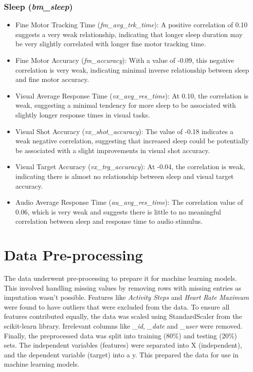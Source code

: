 \subsubsection*{Sleep (\textit{bm\_sleep})}

\begin{itemize}
    \item Fine Motor Tracking Time (\textit{fm\_avg\_trk\_time}): A positive correlation of 0.10 suggests a very weak relationship, indicating that longer sleep duration
    may be very slightly correlated with longer fine motor tracking time. 
        
    \item Fine Motor Accuracy (\textit{fm\_accuracy}): With a value of -0.09, this negative correlation is very weak, indicating minimal inverse relationship between sleep
    and fine motor accuracy.
    
    \item Visual Average Response Time (\textit{vx\_avg\_res\_time}): At 0.10, the correlation is weak, suggesting a minimal tendency for more sleep to be associated with slightly
    longer response times in visual tasks.
    
    \item Visual Shot Accuracy (\textit{vx\_shot\_accuracy}): The value of -0.18 indicates a weak negative correlation, suggesting that increased sleep could be potentially be associated
    with a slight improvements in visual shot accuracy. 

    \item Visual Target Accuracy (\textit{vx\_trg\_accuracy}): At -0.04, the correlation is weak, indicating there is almost no relationship between sleep and visual target accuracy.
    
    \item Audio Average Response Time (\textit{au\_avg\_res\_time}): The correlation value of 0.06, which is very weak and suggests there is little to no meaningful correlation between
    sleep and response time to audio stimulus.
    
\end{itemize}


\section{Data Pre-processing}
The data underwent pre-processing to prepare it for machine learning models. This involved handling missing values by removing rows with missing entries as imputation wasn't possible.
Features like \textit{Activity Steps} and \textit{Heart Rate Maximum} were found to have outliers that were excluded from the data. 
To ensure all features contributed equally, the data was scaled using StandardScaler from the scikit-learn library. Irrelevant columns like \textit{\_id}, \textit{\_date} and 
\textit{\_user} were removed. Finally, the preprocessed data was split into training (80\%) and testing (20\%) sets. The independent variables (features) were separated into
X (independent), and the dependent variable (target) into a y. This prepared the data for use in machine learning models.


